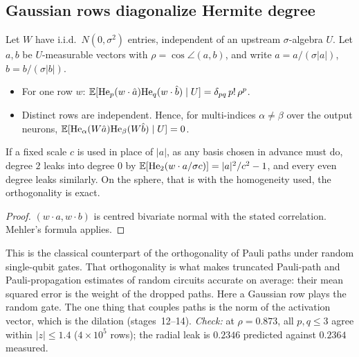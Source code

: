 \label{sec:rows}
\subsection{Gaussian rows diagonalize Hermite degree}
\begin{theorem}\label{thm:rowmehler}
Let $W$ have i.i.d.\ $N(0,\sigma^2)$ entries, independent of an upstream $\sigma$-algebra $U$. Let $a,b$ be $U$-measurable vectors with
$\rho=\cos\angle(a,b)$, and write $\hat a=a/(\sigma|a|)$, $\hat b=b/(\sigma|b|)$.
\begin{itemize}[leftmargin=*]
\item For one row $w$: $\mathbb E[\mathrm{He}_p(w\cdot\hat a)\mathrm{He}_q(w\cdot\hat b)\mid U]=\delta_{pq}\,p!\,\rho^p$.
\item Distinct rows are independent. Hence, for multi-indices $\alpha\ne\beta$ over the output neurons,
$\mathbb E[\mathrm{He}_\alpha(W\hat a)\mathrm{He}_\beta(W\hat b)\mid U]=0$.
\end{itemize}
If a fixed scale $c$ is used in place of $|a|$, as any basis chosen in advance must do, degree $2$ leaks into degree $0$ by
$\mathbb E[\mathrm{He}_2(w\cdot a/\sigma c)]=|a|^2/c^2-1$, and every even degree leaks similarly. On the sphere, that is with the homogeneity used, the
orthogonality is exact.
\end{theorem}
\begin{proof}
$(w\cdot a,w\cdot b)$ is centred bivariate normal with the stated correlation. Mehler's formula applies.
\end{proof}
This is the classical counterpart of the orthogonality of Pauli paths under random single-qubit gates. That orthogonality is what makes
truncated Pauli-path and Pauli-propagation estimates of random circuits accurate on average: their mean squared error is the weight of
the dropped paths. Here a Gaussian row plays the random gate. The one thing that couples paths is the norm of the activation vector,
which is the dilation (stages~12--14). \emph{Check:} at $\rho=0.873$, all $p,q\le3$ agree within $|z|\le1.4$ ($4\times10^5$ rows); the
radial leak is $0.2346$ predicted against $0.2364$ measured.

